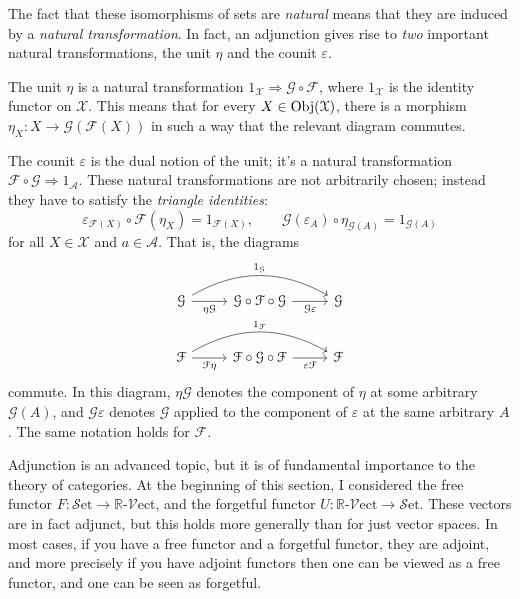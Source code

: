 \documentclass[11pt, letterpaper]{article}
\newcommand{\Set}{\mathcal{S}\mathrm{et}}
\renewcommand{\Vect}[1]{#1\text{-}\mathcal{V}\mathrm{ect}}
\begin{document}
The fact that these isomorphisms of sets are \emph{natural} means that they are induced by a \emph{natural transformation}. In fact, an adjunction gives rise to \emph{two} important natural transformations, the unit $\eta $ and the counit $\varepsilon $.

The unit $\eta $ is a natural transformation $ 1_{\mathcal{X} }  \Rightarrow \mathcal{G} \circ \mathcal{F} $, where $1_{\mathcal{X} } $ is the identity functor on $\mathcal{X} $. This means that for every $X\in \operatorname{Obj}(\mathcal{X} ) $, there is a morphism $\eta_X : X \to \mathcal{G} (\mathcal{F} (X))$ in such a way that the relevant diagram commutes.

The counit $\varepsilon $ is the dual notion of the unit; it's a natural transformation $ \mathcal{F} \circ \mathcal{G}  \Rightarrow 1_{\mathcal{A} } $. These natural transformations are not arbitrarily chosen; instead they have to satisfy the \emph{triangle identities}:
\[
	\varepsilon_{\mathcal{F} (X)} \circ \mathcal{F} (\eta_X)=1_{\mathcal{F} (X)} ,\qquad \mathcal{G} (\varepsilon _A)\circ \eta_{\mathcal{G} (A)} =1_{\mathcal{G} (A)} 
\]
for all $X \in \mathcal{X} $ and $a\in \mathcal{A} $. That is, the diagrams
\[\begin{tikzcd}[row sep = 2.5em, column sep = 2.5em]
	\mathcal{G} \ar[r, "\eta \mathcal{G} "']\ar[rr, bend left, "1_{\mathcal{G} } "]&\mathcal{G} \circ \mathcal{F} \circ \mathcal{G} \ar[r, "\mathcal{G} \varepsilon "']&\mathcal{G} \\
	\mathcal{F} \ar[r, "\mathcal{F} \eta "']\ar[rr, bend left, "1_{\mathcal{F} } "]&\mathcal{F}\circ  \mathcal{G}\circ  \mathcal{F} \ar[r, "\varepsilon \mathcal{F}  "']&\mathcal{F} 
\end{tikzcd}\]
commute. In this diagram, $\eta \mathcal{G} $ denotes the component of $\eta $ at some arbitrary $\mathcal{G} (A)$, and $\mathcal{G} \varepsilon $ denotes $\mathcal{G} $ applied to the component of $\varepsilon $ at the same arbitrary $A$. The same notation holds for $\mathcal{F} $.

Adjunction is an advanced topic, but it is of fundamental importance to the theory of categories. At the beginning of this section, I considered the free functor $F : \Set  \to \Vect{\mathbb{R} } $, and the forgetful functor $U : \Vect{\mathbb{R} }  \to \Set $. These vectors are in fact adjunct, but this holds more generally than for just vector spaces. In most cases, if you have a free functor and a forgetful functor, they are adjoint, and more precisely if you have adjoint functors then one can be viewed as a free functor, and one can be seen as forgetful.
\end{document}
